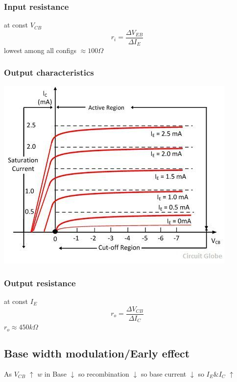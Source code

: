 \documentclass[10pt, a4paper]{report}
\begin{document}
	\subsubsection{Input resistance}
	at const $ V_{CB} $
	$$r_i = \dfrac{\Delta V_{EB}}{\Delta I_E} $$
	lowest among all configs $\approx 100 \Omega$
	\subsubsection{Output characteristics}
	\includegraphics[width=0.6\linewidth]{img/oputputcharacteristicscbconfiguration}
	\subsubsection{Output resistance}
	at const $ I_E $
	$$r_o = \dfrac{\Delta V_{CB}}{\Delta I_C} $$
	$ r_o \approx 450 k\Omega $
	\subsection{Base width modulation/Early effect}
	As $ V_{CB} $ $\uparrow$ $ w $ in Base $\downarrow$ so recombination $\downarrow$ so base current $\downarrow$ so $ I_E \& I_C $ $\uparrow$
\end{document}
